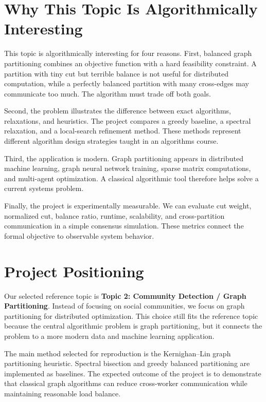\documentclass[11pt]{article}
\begin{document}
\section{Why This Topic Is Algorithmically Interesting}

This topic is algorithmically interesting for four reasons. First, balanced
graph partitioning combines an objective function with a hard feasibility
constraint. A partition with tiny cut but terrible balance is not useful for
distributed computation, while a perfectly balanced partition with many
cross-edges may communicate too much. The algorithm must trade off both goals.

Second, the problem illustrates the difference between exact algorithms,
relaxations, and heuristics. The project compares a greedy baseline, a spectral
relaxation, and a local-search refinement method. These methods represent
different algorithm design strategies taught in an algorithms course.

Third, the application is modern. Graph partitioning appears in distributed
machine learning, graph neural network training, sparse matrix computations,
and multi-agent optimization. A classical algorithmic tool therefore helps
solve a current systems problem.

Finally, the project is experimentally measurable. We can evaluate cut weight,
normalized cut, balance ratio, runtime, scalability, and cross-partition
communication in a simple consensus simulation. These metrics connect the
formal objective to observable system behavior.

\section{Project Positioning}

Our selected reference topic is \textbf{Topic 2: Community Detection / Graph
Partitioning}. Instead of focusing on social communities, we focus on graph
partitioning for distributed optimization. This choice still fits the reference
topic because the central algorithmic problem is graph partitioning, but it
connects the problem to a more modern data and machine learning application.

The main method selected for reproduction is the Kernighan--Lin graph
partitioning heuristic. Spectral bisection and greedy balanced partitioning are
implemented as baselines. The expected outcome of the project is to demonstrate
that classical graph algorithms can reduce cross-worker communication while
maintaining reasonable load balance.
\end{document}
